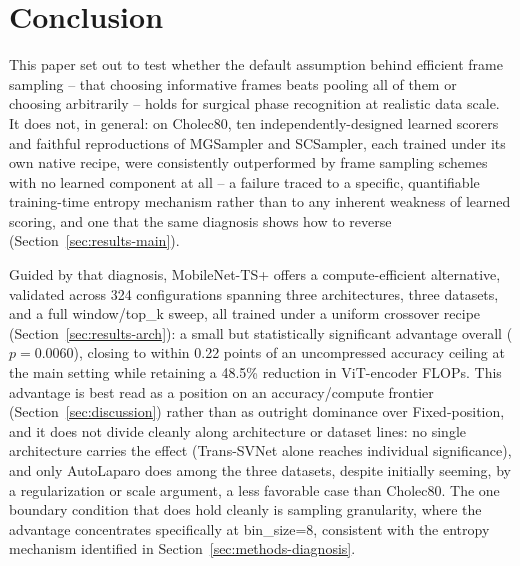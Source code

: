 \documentclass[preprint,12pt]{elsarticle}
\begin{document}
\section{Conclusion}
\label{sec:conclusion}

This paper set out to test whether the default assumption behind efficient frame sampling -- that choosing informative frames beats pooling all of them or choosing arbitrarily -- holds for surgical phase recognition at realistic data scale. It does not, in general: on Cholec80, ten independently-designed learned scorers and faithful reproductions of MGSampler and SCSampler, each trained under its own native recipe, were consistently outperformed by frame sampling schemes with no learned component at all -- a failure traced to a specific, quantifiable training-time entropy mechanism rather than to any inherent weakness of learned scoring, and one that the same diagnosis shows how to reverse (Section~\ref{sec:results-main}).

Guided by that diagnosis, MobileNet-TS+ offers a compute-efficient alternative, validated across 324 configurations spanning three architectures, three datasets, and a full window/top\_k sweep, all trained under a uniform crossover recipe (Section~\ref{sec:results-arch}): a small but statistically significant advantage overall ($p=0.0060$), closing to within 0.22 points of an uncompressed accuracy ceiling at the main setting while retaining a 48.5\% reduction in ViT-encoder FLOPs. This advantage is best read as a position on an accuracy/compute frontier (Section~\ref{sec:discussion}) rather than as outright dominance over Fixed-position, and it does not divide cleanly along architecture or dataset lines: no single architecture carries the effect (Trans-SVNet alone reaches individual significance), and only AutoLaparo does among the three datasets, despite initially seeming, by a regularization or scale argument, a less favorable case than Cholec80. The one boundary condition that does hold cleanly is sampling granularity, where the advantage concentrates specifically at bin\_size=8, consistent with the entropy mechanism identified in Section~\ref{sec:methods-diagnosis}.
\end{document}
